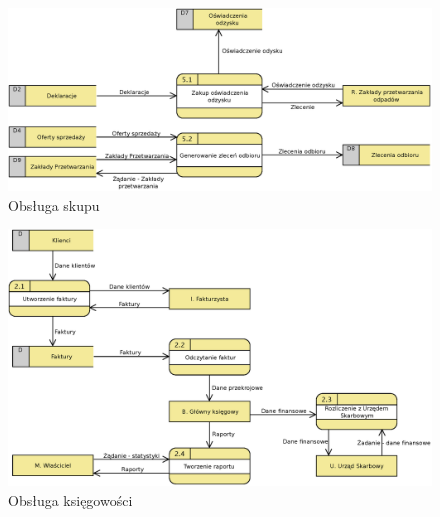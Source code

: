 	\begin{figure}[H]
		\centering
		\centerline{\includegraphics[width=1.1\textwidth]{img/DFD/2-level-skup.eps}}
		\caption{Obsługa skupu}
	\end{figure}

	\begin{figure}[H]
		\centering
		\centerline{\includegraphics[width=1.1\textwidth]{img/DFD/2-level-ksiegowosc.eps}}
		\caption{Obsługa księgowości}
	\end{figure}